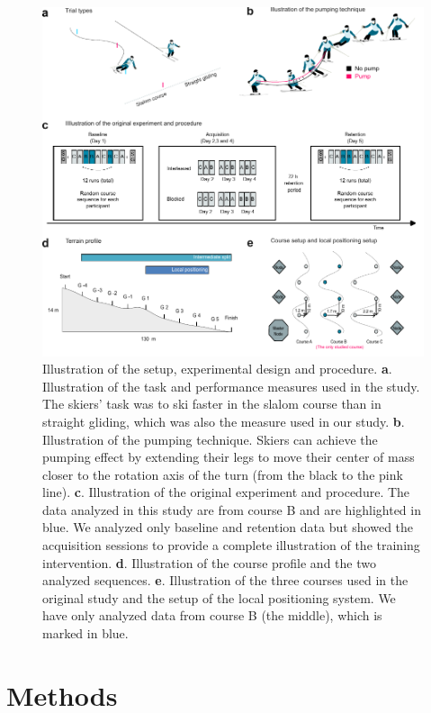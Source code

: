 \documentclass{article}
\begin{document}
\begin{figure}[H]
\centering
\includegraphics{figurer/figure_design_3.pdf}
\caption{Illustration of the setup, experimental design and procedure. \textbf{a}. Illustration of the task and performance measures used in the study. The skiers' task was to ski faster in the slalom course than in straight gliding, which was also the measure used in our study. \textbf{b}. Illustration of the pumping technique. Skiers can achieve the pumping effect by extending their legs to move their center of mass closer to the rotation axis of the turn (from the black to the pink line). \textbf{c}. Illustration of the original experiment and procedure. The data analyzed in this study are from course B and are highlighted in blue. We analyzed only baseline and retention data but showed the acquisition sessions to provide a complete illustration of the training intervention. \textbf{d}. Illustration of the course profile and the two analyzed sequences. \textbf{e}. Illustration of the three courses used in the original study and the setup of the local positioning system. We have only analyzed data from course B (the middle), which is marked in blue.}\label{fig: design}
\end{figure}



\section{Methods}
\end{document}
